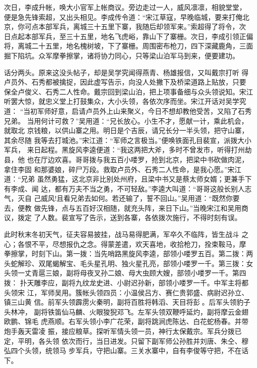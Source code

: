 次日，李成升帐，唤大小官军上帐商议。旁边走过一人，威风凛凛，相貌堂堂，
便是急先锋索超，又出头相见。李成传令道：“宋江草寇，早晚临城，要来打俺北
京，你可点本部军兵，离城三十五里下寨，我随后却领军来。”索超得了将令，次
日点起本部军兵，至三十五里，地名飞虎峪，靠山下了寨栅。次日，李成引领正偏
将，离城二十五里，地名槐树坡，下了寨栅。周围密布枪刀，四下深藏鹿角，三面
掘下陷坑。众军摩拳擦掌，诸将协力同心，只等梁山泊军马到来，便要建功。

话分两头。原来这没头帖子，却是吴学究闻得燕青、杨雄报信，又叫戴宗打听
得卢员外、石秀都被擒捉，因此虚写告示，向没人处撇下及桥梁道路上贴放，只要
保全卢俊义、石秀二人性命。戴宗回到梁山泊，把上项事备细与众头领说知。宋江
听罢大惊，就忠义堂上打鼓集众，大小头领，各依次序而坐。宋江开话对吴学究道：
“当初军师好意，启请卢员外上山来聚义，今日不想却教他受苦，又陷了石秀兄弟。
当用何计可救？”吴用道：“兄长放心。小生不才，愿献一计，乘此机会，就取北
京钱粮，以供山寨之用。明日是个吉辰，请兄长分一半头领，把守山寨，其余尽随
我等去打城池。”宋江道：“军师之言极当。”便唤铁面孔目裴宣，派拨大小军兵，
来日起程。黑旋风李逵便道：“我这两把大斧，多时不曾发市，听得打州劫县，他
也在厅边欢喜。哥哥拨与我五百小喽罗，抢到北京，把梁中书砍做肉泥，拿住李固
和那婆娘，碎尸万段。救取卢员外、石秀二人性命，是我心愿。”宋江道：“兄弟
虽然勇猛，这北京非比别处州府，且梁中书又是蔡太师女婿；更兼手下有李成、闻
达，都有万夫不当之勇，不可轻敌。”李逵大叫道：“哥哥这般长别人志气，灭自
己威风!且看兄弟去如何。若还输了，誓不回山。”吴用道：“既然你要去，便教
做先锋，点与五百好汉相随，就充头阵，来日下山。”当晚宋江和吴用商议，拨定
了人数。裴宣写了告示，送到各寨，各依拨次施行，不得时刻有误。

此时秋末冬初天气，征夫容易披挂，战马易得肥满，军卒久不临阵，皆生战斗
之心；各恨不平，尽想报仇之念。得蒙差遣，欢天喜地，收拾枪刀，拴束鞍马，摩
拳擦掌，时刻下山。第一拨：当先哨路黑旋风李逵，部领小喽罗五百。第二拨：两
头蛇解珍、双尾蝎解宝、毛头星孔明、独火星孔亮，部领小喽罗一千。第三拨：女
头领一丈青扈三娘，副将母夜叉孙二娘、母大虫顾大嫂，部领小喽罗一千。第四拨：
扑天雕李应，副将九纹龙史进、小尉迟孙新，部领小喽罗一千。中军主将都头领宋
江，军师吴用。簇帐头领四员：小温侯吕方、赛仁贵郭盛、病尉迟孙立、镇三山黄
信。前军头领霹雳火秦明，副将百胜将韩滔、天目将彭。后军头领豹子头林冲，
副将铁笛仙马麟、火眼狻猊邓飞。左军头领双鞭呼延灼，副将摩云金翅欧鹏、锦毛
虎燕顺。右军头领小李广花荣，副将跳涧虎陈达、白花蛇杨春。并带炮手轰天雷凌
振，接应粮草。探听军情头领一员，神行太保戴宗。军兵分拨已定，平明，各头领
依次而行，当日进发。只留下副军师公孙胜并刘唐、朱仝、穆弘四个头领，统领马
步军兵，守把山寨。三关水寨中，自有李俊等守把，不在话下。

